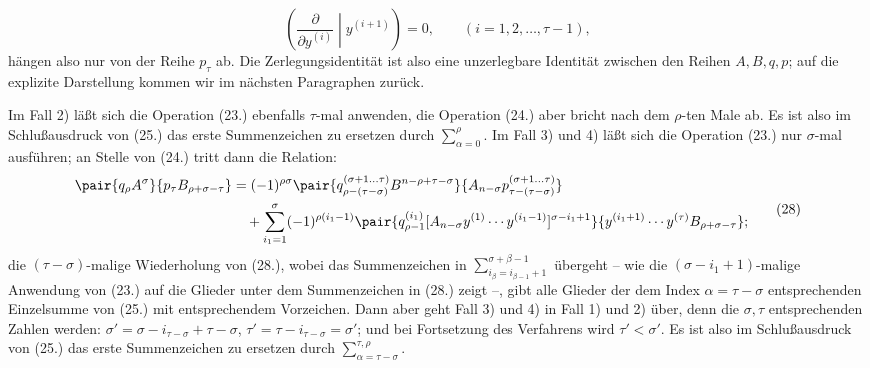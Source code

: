 \begin{equation}
 \left(\frac{\partial}{\partial y^{(i)}}\middle|y^{(i+1)}\right)=0,
 \qquad (i=1,2,\ldots,\tau-1),
\tag{27}
\end{equation}
h\"angen also nur von der Reihe $p_\tau$ ab. Die Zerlegungsidentit\"at ist also eine unzerlegbare Identit\"at zwischen den Reihen $A,B,q,p$; auf die explizite Darstellung kommen wir im n\"achsten Paragraphen zur\"uck.

Im Fall 2) l\"a\ss t sich die Operation (23.) ebenfalls $\tau$-mal anwenden, die Operation (24.) aber bricht nach dem $\rho$-ten Male ab. Es ist also im Schlu\ss ausdruck von (25.) das erste Summenzeichen zu ersetzen durch $\sum_{\alpha=0}^{\rho}$. Im Fall 3) und 4) l\"a\ss t sich die Operation (23.) nur $\sigma$-mal ausf\"uhren; an Stelle von (24.) tritt dann die Relation:
\begin{equation}
\begin{aligned}
\pair{q_\rho A^\sigma}{p_\tau B_{\rho+\sigma-\tau}}
&=(-1)^{\rho\sigma}
 \pair{q_{\rho-(\tau-\sigma)}^{(\sigma+1\ldots\tau)}B^{n-\rho+\tau-\sigma}}{A_{n-\sigma}p_{\tau-(\tau-\sigma)}^{(\sigma+1\ldots\tau)}}\\
&\quad+\sum_{i_1=1}^{\sigma}(-1)^{\rho(i_1-1)}
 \pair{q_{\rho-1}^{(i_1)}[A_{n-\sigma}y^{(1)}\cdots y^{(i_1-1)}]^{\sigma-i_1+1}}
 {y^{(i_1+1)}\cdots y^{(\tau)}B_{\rho+\sigma-\tau}};
\end{aligned}
\tag{28}
\end{equation}
die $(\tau-\sigma)$-malige Wiederholung von (28.), wobei das Summenzeichen in $\sum_{i_\beta=i_{\beta-1}+1}^{\sigma+\beta-1}$ \"ubergeht -- wie die $(\sigma-i_1+1)$-malige Anwendung von (23.) auf die Glieder unter dem Summenzeichen in (28.) zeigt --, gibt alle Glieder der dem Index $\alpha=\tau-\sigma$ entsprechenden Einzelsumme von (25.) mit entsprechendem Vorzeichen. Dann aber geht Fall 3) und 4) in Fall 1) und 2) \"uber, denn die $\sigma,\tau$ entsprechenden Zahlen werden: $\sigma'=\sigma-i_{\tau-\sigma}+\tau-\sigma$, $\tau'=\tau-i_{\tau-\sigma}=\sigma'$; und bei Fortsetzung des Verfahrens wird $\tau'<\sigma'$. Es ist also im Schlu\ss ausdruck von (25.) das erste Summenzeichen zu ersetzen durch $\sum_{\alpha=\tau-\sigma}^{\tau,\rho}$.

